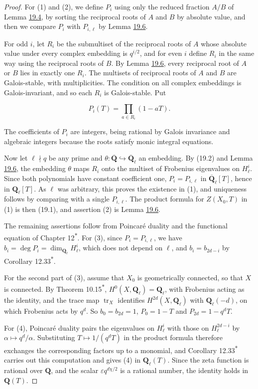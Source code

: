 \documentclass[11pt]{article}
\newcommand{\bpout}[1]{#1\textsuperscript{\hyperlink{bp-outside}{\ensuremath{\ast}}}}
\begin{document}
\begin{proof}[{Proof}]\label{bp25}%
For (1) and (2), we define \(P_i\) using only the reduced fraction \(A/B\) of Lemma \hyperref[bp15]{19.4}, by sorting the reciprocal roots of \(A\) and \(B\) by absolute value, and then we compare \(P_i\) with \(P_{i,\ell}\) by Lemma \hyperref[bp22]{19.6}.

For odd \(i\), let \(R_i\) be the submultiset of the reciprocal roots of \(A\) whose absolute value under every complex embedding is \(q^{i/2}\), and for even \(i\) define \(R_i\) in the same way using the reciprocal roots of \(B\). By Lemma \hyperref[bp22]{19.6}, every reciprocal root of \(A\) or \(B\) lies in exactly one \(R_i\). The multisets of reciprocal roots of \(A\) and \(B\) are Galois-stable, with multiplicities. The condition on all complex embeddings is Galois-invariant, and so each \(R_i\) is Galois-stable. Put

\[
P_i(T)=\prod_{a\in R_i}(1-aT).
\]

The coefficients of \(P_i\) are integers, being rational by Galois invariance and algebraic integers because the roots satisfy monic integral equations.

Now let \(\ell\nmid q\) be any prime and \(\theta:\overline{\mathbf Q}\hookrightarrow\overline{\mathbf Q}_\ell\) an embedding. By (19.2) and Lemma \hyperref[bp22]{19.6}, the embedding \(\theta\) maps \(R_i\) onto the multiset of Frobenius eigenvalues on \(H^i_\ell\). Since both polynomials have constant coefficient one, \(P_i=P_{i,\ell}\) in \(\overline{\mathbf Q}_\ell[T]\), hence in \(\mathbf Q_\ell[T]\). As \(\ell\) was arbitrary, this proves the existence in (1), and uniqueness follows by comparing with a single \(P_{i,\ell}\). The product formula for \(Z(X_0,T)\) in (1) is then (19.1), and assertion (2) is Lemma \hyperref[bp22]{19.6}.

The remaining assertions follow from Poincaré duality and the functional equation of Chapter \bpout{12}. For (3), since \(P_i=P_{i,\ell}\), we have \(b_i=\deg P_i=\dim_{\mathbf Q_\ell}H^i_\ell\), which does not depend on \(\ell\), and \(b_i=b_{2d-i}\) by Corollary \bpout{12.33}.

For the second part of (3), assume that \(X_0\) is geometrically connected, so that \(X\) is connected. By Theorem \bpout{10.15}, \(H^0(X,\mathbf Q_\ell)=\mathbf Q_\ell\), with Frobenius acting as the identity, and the trace map \(\operatorname{tr}_X\) identifies \(H^{2d}(X,\mathbf Q_\ell)\) with \(\mathbf Q_\ell(-d)\), on which Frobenius acts by \(q^d\). So \(b_0=b_{2d}=1\), \(P_0=1-T\) and \(P_{2d}=1-q^dT\).

For (4), Poincaré duality pairs the eigenvalues on \(H^i_\ell\) with those on \(H^{2d-i}_\ell\) by \(\alpha\mapsto q^d/\alpha\). Substituting \(T\mapsto1/(q^dT)\) in the product formula therefore exchanges the corresponding factors up to a monomial, and Corollary \bpout{12.33} carries out this computation and gives (4) in \(\mathbf Q_\ell(T)\). Since the zeta function is rational over \(\mathbf Q\), and the scalar \(\varepsilon q^{d\chi/2}\) is a rational number, the identity holds in \(\mathbf Q(T)\).
\end{proof}
\end{document}
